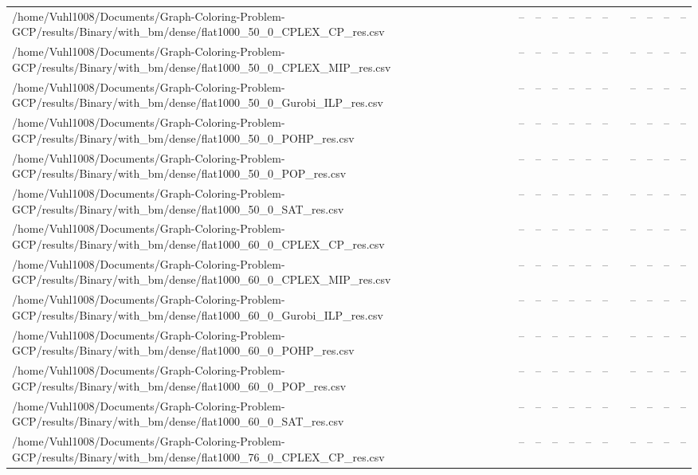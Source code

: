 \begin{table}[htbp]
\begin{tabular}{llllllllllll}
/home/Vuhl1008/Documents/Graph-Coloring-Problem-GCP/results/Binary/with\_bm/dense/flat1000\_50\_0\_CPLEX\_CP\_res.csv & -- & -- & -- & -- & -- & -- & {} & -- & -- & -- & -- \\
/home/Vuhl1008/Documents/Graph-Coloring-Problem-GCP/results/Binary/with\_bm/dense/flat1000\_50\_0\_CPLEX\_MIP\_res.csv & -- & -- & -- & -- & -- & -- & {} & -- & -- & -- & -- \\
/home/Vuhl1008/Documents/Graph-Coloring-Problem-GCP/results/Binary/with\_bm/dense/flat1000\_50\_0\_Gurobi\_ILP\_res.csv & -- & -- & -- & -- & -- & -- & {} & -- & -- & -- & -- \\
/home/Vuhl1008/Documents/Graph-Coloring-Problem-GCP/results/Binary/with\_bm/dense/flat1000\_50\_0\_POHP\_res.csv & -- & -- & -- & -- & -- & -- & {} & -- & -- & -- & -- \\
/home/Vuhl1008/Documents/Graph-Coloring-Problem-GCP/results/Binary/with\_bm/dense/flat1000\_50\_0\_POP\_res.csv & -- & -- & -- & -- & -- & -- & {} & -- & -- & -- & -- \\
/home/Vuhl1008/Documents/Graph-Coloring-Problem-GCP/results/Binary/with\_bm/dense/flat1000\_50\_0\_SAT\_res.csv & -- & -- & -- & -- & -- & -- & {} & -- & -- & -- & -- \\
/home/Vuhl1008/Documents/Graph-Coloring-Problem-GCP/results/Binary/with\_bm/dense/flat1000\_60\_0\_CPLEX\_CP\_res.csv & -- & -- & -- & -- & -- & -- & {} & -- & -- & -- & -- \\
/home/Vuhl1008/Documents/Graph-Coloring-Problem-GCP/results/Binary/with\_bm/dense/flat1000\_60\_0\_CPLEX\_MIP\_res.csv & -- & -- & -- & -- & -- & -- & {} & -- & -- & -- & -- \\
/home/Vuhl1008/Documents/Graph-Coloring-Problem-GCP/results/Binary/with\_bm/dense/flat1000\_60\_0\_Gurobi\_ILP\_res.csv & -- & -- & -- & -- & -- & -- & {} & -- & -- & -- & -- \\
/home/Vuhl1008/Documents/Graph-Coloring-Problem-GCP/results/Binary/with\_bm/dense/flat1000\_60\_0\_POHP\_res.csv & -- & -- & -- & -- & -- & -- & {} & -- & -- & -- & -- \\
/home/Vuhl1008/Documents/Graph-Coloring-Problem-GCP/results/Binary/with\_bm/dense/flat1000\_60\_0\_POP\_res.csv & -- & -- & -- & -- & -- & -- & {} & -- & -- & -- & -- \\
/home/Vuhl1008/Documents/Graph-Coloring-Problem-GCP/results/Binary/with\_bm/dense/flat1000\_60\_0\_SAT\_res.csv & -- & -- & -- & -- & -- & -- & {} & -- & -- & -- & -- \\
/home/Vuhl1008/Documents/Graph-Coloring-Problem-GCP/results/Binary/with\_bm/dense/flat1000\_76\_0\_CPLEX\_CP\_res.csv & -- & -- & -- & -- & -- & -- & {} & -- & -- & -- & -- \\

\end{tabular}
\end{table}
